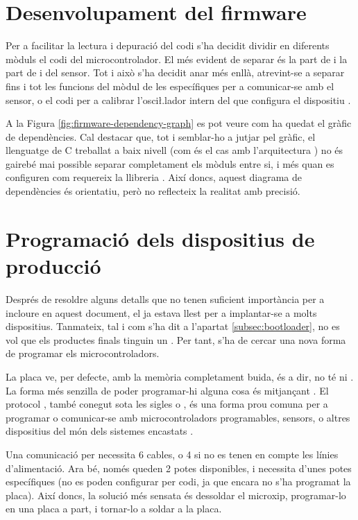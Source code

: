 \section{Desenvolupament del firmware}

Per a facilitar la lectura i depuració del codi s'ha decidit dividir en
diferents mòduls el codi del microcontrolador. El més evident de separar és
la part de  i la part de  i del sensor. Tot i això s'ha
decidit anar més enllà, atrevint-se a separar fins i tot les funcions del mòdul
 de les específiques per a comunicar-se amb el sensor, o el codi per
a calibrar l'osci\l.lador intern del que configura el dispositiu . 

A la Figura \ref{fig:firmware-dependency-graph} es pot veure com ha quedat el gràfic
de dependències. Cal destacar que, tot i semblar-ho a jutjar pel gràfic, el
llenguatge de C treballat a baix nivell (com és el cas amb l'arquitectura
) no és gairebé mai possible separar completament els mòduls entre
si, i més quan es configuren com requereix la llibreria . Així
doncs, aquest diagrama de dependències és orientatiu, però no reflecteix la
realitat amb precisió.



\section{Programació dels dispositius de producció}

Després de resoldre alguns detalls que no tenen suficient importància per a
incloure en aquest document, el  ja estava llest per a 
implantar-se a molts dispositius. Tanmateix, tal i com s'ha dit a
l'apartat \ref{subsec:bootloader}, no es vol que els productes finals tinguin
un . Per tant, s'ha de cercar una nova forma de programar
els microcontroladors.

La placa  ve, per defecte, amb la memòria  completament
buida, és a dir, no té ni . La forma més senzilla de poder
programar-hi alguna cosa és mitjançant . El protocol
, també conegut sota les sigles  o
, és una forma prou comuna per a
programar o comunicar-se amb microcontroladors programables, sensors, o altres
dispositius del món dels sistemes encastats \cite{Isp}.

Una comunicació per  necessita 6 cables, o 4 si no es tenen en compte
les línies d'alimentació. Ara bé, només queden 2 potes disponibles, i 
necessita d'unes potes específiques (no es poden configurar per codi, ja que
encara no s'ha programat la placa). Així doncs, la solució més sensata és
dessoldar el microxip, programar-lo en una placa a part, i tornar-lo a soldar
a la placa.

